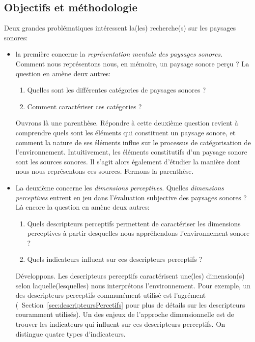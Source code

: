 \subsection{Objectifs et méthodologie}

Deux grandes problématiques intéressent la(les) recherche(s) sur les paysages sonores:

\begin{itemize}
\item la première concerne la \emph{représentation mentale des paysages sonores}. Comment nous représentons nous, en mémoire, un paysage sonore perçu ? La question en amène deux autres:

\begin{enumerate}
\item Quelles sont les différentes catégories de paysages sonores ?
\item Comment caractériser ces catégories ?
\end{enumerate}

Ouvrons là une parenthèse. Répondre à cette deuxième question revient à  comprendre quels sont les éléments qui constituent un paysage sonore, et comment la nature de ses éléments influe sur le processus de catégorisation de l'environnement. Intuitivement, les éléments constitutifs d'un paysage sonore sont les sources sonores. Il s'agit alors également d'étudier la manière dont nous nous représentons ces sources. Fermons la parenthèse.

\item La deuxième concerne les \emph{dimensions perceptives}.  Quelles \emph{dimensions perceptives} entrent en jeu dans l'évaluation subjective des paysages sonores ?  Là encore la question en amène deux autres:
\begin{enumerate}
\item Quels descripteurs perceptifs permettent de caractériser les dimensions perceptives à partir desquelles nous appréhendons l'environnement sonore ?
\item Quels indicateurs influent sur ces descripteurs perceptifs ?
\end{enumerate}

Développons. Les descripteurs perceptifs caractérisent une(les) dimension(s) selon laquelle(lesquelles) nous interprétons l'environnement. Pour exemple, un des descripteurs perceptifs communément utilisé est l'agrément (\Cf~Section~\ref{sec:descripteursPercetifs} pour plus de détails sur les descripteurs couramment utilisés). 
Un des enjeux de l'approche dimensionnelle est de trouver les indicateurs qui influent sur ces descripteurs perceptifs. On distingue quatre types d'indicateurs.


\end{itemize}
